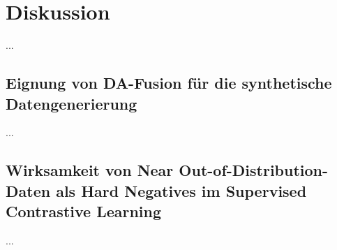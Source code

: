 \chapter{Diskussion}

...


\section{Eignung von DA-Fusion für die synthetische Datengenerierung}

...

\section{Wirksamkeit von Near Out-of-Distribution-Daten als Hard Negatives im Supervised Contrastive Learning}

...